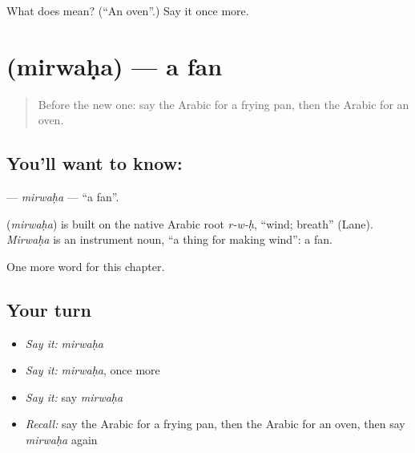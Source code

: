 \begin{tcolorbox}[breakable,colback=teal!4,colframe=teal!35!black,title={Before you move on}]
What does  mean? (\textquotedblleft{}An oven\textquotedblright{}.) Say it once more.
\end{tcolorbox}
\section[\texorpdfstring{\ar{مروحة} (mirwaḥa)}{مروحة (mirwaḥa)}]{ (mirwaḥa) — a fan}

\label{lesson:AR-C116-mirwaha}



\begin{quote}
Before the new one: say the Arabic for a frying pan, then the Arabic for an oven.
\end{quote}

\subsection*{You'll want to know: }
\textbf{} — \emph{mirwaḥa} — \textquotedblleft{}a fan\textquotedblright{}.

\begin{cousinweb}
\textbf{} (\emph{mirwaḥa}) is built on the native Arabic root \emph{r-w-ḥ}, \textquotedblleft{}wind; breath\textquotedblright{} (Lane). \emph{Mirwaḥa} is an instrument noun, \textquotedblleft{}a thing for making wind\textquotedblright{}: a fan.
\end{cousinweb}

\begin{grammarlens}[title={What you've built}]
One more word for this chapter.
\end{grammarlens}

\subsection*{Your turn}
\begin{itemize}
\raggedright
  \item \emph{Say it:} \emph{mirwaḥa}
  \item \emph{Say it:} \emph{mirwaḥa}, once more
  \item \emph{Say it:} say \emph{mirwaḥa}
  \item \emph{Recall:} say the Arabic for a frying pan, then the Arabic for an oven, then say \emph{mirwaḥa} again
\end{itemize}

